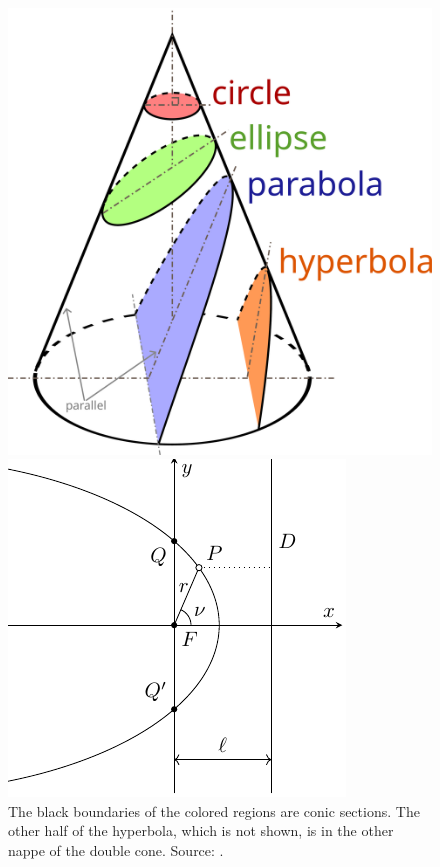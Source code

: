\documentclass[../main.tex]{subfiles}
\begin{document}
\begin{figure}[htbp]
  \centering
  \begin{minipage}[ht]{0.45\textwidth}
    \centering
    \includegraphics[width=\textwidth]{Images/Conic_Sections.pdf}
    \caption{The black boundaries of the colored regions are conic sections. The other half of the hyperbola, which is not shown, is in the other nappe of the double cone. Source: \cite{wiki:conic}.}
    \label{fig:conics}
  \end{minipage}
  \hspace{0.0333333\textwidth}
  \begin{minipage}[ht]{0.45\textwidth}
    \centering
    \includegraphics[width=\textwidth]{Images/conics.pdf}

\end{minipage}
\end{figure}
\end{document}
